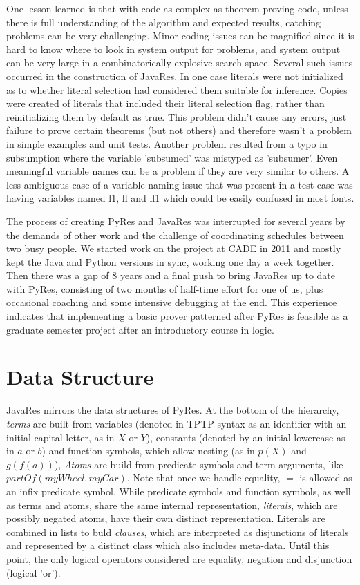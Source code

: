 \documentclass{llncs}
\begin{document}
One lesson learned is that with code as complex as theorem proving
code, unless there is full understanding of the algorithm and expected
results, catching problems can be very challenging.  Minor coding
issues can be magnified since it is hard to know where to look in
system output for problems, and system output can be very large in a
combinatorically explosive search space.  Several such issues occurred
in the construction of JavaRes.  In one case literals were not
initialized as to whether literal selection had considered them
suitable for inference.  Copies were created of literals that included
their literal selection flag, rather than reinitializing them by
default as true.  This problem didn't cause any errors, just failure
to prove certain theorems (but not others) and therefore wasn't a
problem in simple examples and unit tests.  Another problem resulted
from a typo in subsumption where the variable 'subsumed' was mistyped
as 'subsumer'.  Even meaningful variable names can be a problem if
they are very similar to others.  A less ambiguous case of a variable
naming issue that was present in a test case was having variables
named l1, ll and ll1 which could be easily confused in most fonts.

The process of creating PyRes and JavaRes was interrupted for several
years by the demands of other work and the challenge of coordinating
schedules between two busy people.  We started work on the project at
CADE in 2011 and mostly kept the Java and Python versions in sync,
working one day a week together.  Then there was a gap of 8 years and
a final push to bring JavaRes up to date with PyRes, consisting of two
months of half-time effort for one of us, plus occasional coaching and
some intensive debugging at the end.  This experience indicates that
implementing a basic prover patterned after PyRes is feasible as a
graduate semester project after an introductory course in logic.

\section{Data Structure}

JavaRes mirrors the data structures of PyRes.  At the bottom of the
hierarchy, \emph{terms} are built from variables (denoted in TPTP
syntax as an identifier with an initial capital letter, as in $X$ or
$Y$), constants (denoted by an initial lowercase as in $a$ or $b$) and
function symbols, which allow nesting (as in $p(X)$ and $g(f(a))$),
\emph{Atoms} are build from predicate symbols and term arguments, like
$partOf(myWheel,myCar)$.  Note that once we handle equality, $=$ is
allowed as an infix predicate symbol. While predicate symbols and
function symbols, as well as terms and atoms, share the same internal
representation, \emph{literals}, which are possibly negated atoms,
have their own distinct representation. Literals are combined in lists
to buld \emph{clauses}, which are interpreted as disjunctions of
literals and represented by a distinct class which also includes
meta-data.  Until this point, the only logical operators considered
are equality, negation and disjunction (logical 'or').
\end{document}
